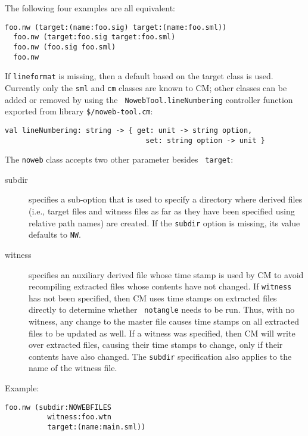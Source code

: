 The following four examples are all equivalent:

\begin{lstlisting}[language=CM]
  foo.nw (target:(name:foo.sig) target:(name:foo.sml))
  foo.nw (target:foo.sig target:foo.sml)
  foo.nw (foo.sig foo.sml)
  foo.nw
\end{lstlisting}%

If {\tt lineformat} is missing, then a default based on the target
class is used.  Currently only the {\tt sml} and {\tt cm} classes are
known to CM; other classes can be added or removed by using the {\tt
NowebTool.lineNumbering} controller function exported from library
{\tt \$/noweb-tool.cm}:

\begin{lstlisting}[language=CM]
  val lineNumbering: string -> { get: unit -> string option,
                                 set: string option -> unit }
\end{lstlisting}%

The {\tt noweb} class accepts two other parameter besides {\tt
target}:

\begin{description}
\item[subdir] specifies a sub-option that is used to specify a
directory where derived files (i.e., target files and witness files as
far as they have been specified using relative path names) are
created.  If the {\tt subdir} option is missing, its value defaults to
{\tt NW}.
\item[witness] specifies an auxiliary derived file whose time stamp is
used by CM to avoid recompiling extracted files whose contents have
not changed.  If {\tt witness} has not been specified, then CM uses
time stamps on extracted files directly to determine whether {\tt
notangle} needs to be run.  Thus, with no witness, any change to the
master file causes time stamps on all extracted files to be updated as
well.  If a witness was specified, then CM will write over extracted
files, causing their time stamps to change, only if their contents
have also changed.  The {\tt subdir} specification also applies to the
name of the witness file.
\end{description}

Example:

\begin{lstlisting}[language=CM]
  foo.nw (subdir:NOWEBFILES
          witness:foo.wtn
          target:(name:main.sml))
\end{lstlisting}%


